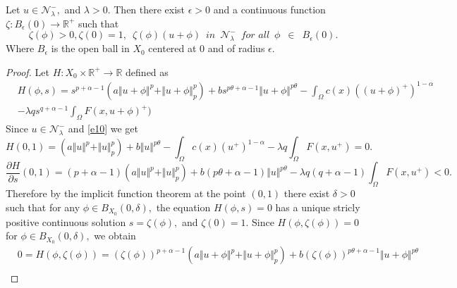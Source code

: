 \documentclass[10pt,twoside,reqno,centertags,draft]{amsart}
\begin{document}
\begin{lemma}\label{l4}
Let $ u \in \mathcal{N}_{\lambda}^{-},$ and $ \lambda > 0.$ Then there exist $ \epsilon > 0$ and a continuous function 
$ \zeta : B_{\epsilon}(0) \longrightarrow \mathbb{R}^{+}$ such that
\begin{equation*}
\zeta(\phi) > 0, \zeta(0) = 1, \,\,\, \zeta(\phi)(u +\phi)\,\,\, in\,\,\, \mathcal{N}_{\lambda}^{-} \,\,\, \textit{for all} \,\,\, \phi \,\,\, \in \,\,\, B_{\epsilon}(0).
\end{equation*}
Where  $ B_{\epsilon}$ is the open ball in $ X_0$ centered at $ 0$ and of radius $ \epsilon.$
\end{lemma}
\begin{proof}
Let $ H : X_0 \times \mathbb{R}^{+} \longrightarrow \mathbb{R}$ defined as
{\footnotesize
\begin{equation*}
\begin{aligned}
& H(\phi, s) =s^{p +\alpha -1} \left( a\Vert u +\phi\Vert^{p} +\Vert u +\phi\Vert^{p}_{p}\right) +b s^{p\theta +\alpha -1}\Vert u +\phi\Vert^{p\theta} -\int_{\Omega}c(x)((u +\phi)^+)^{1 -\alpha}\\
&- \lambda q s^{q +\alpha -1} \int_{\Omega} F(x,u +\phi)^+)
\end{aligned}
\end{equation*}
} 
Since $ u \in \mathcal{N}_{\lambda}^{-}$ and \ref{e10} we get
\begin{equation}\label{e13}
H(0, 1) = \left( a\Vert u\Vert^{p} +\Vert u\Vert^{p}_{p}\right) +b \Vert u\Vert^{p\theta}-\int_{\Omega}c(x)(u^+)^{1 -\alpha} - \lambda q\int_{\Omega} F(x,u^+) =0.
\end{equation}
{\footnotesize
\begin{equation} \label{e14}
\frac{\partial H}{\partial s}(0, 1) =(p +\alpha -1)\left( a\Vert u\Vert^{p} +\Vert u\Vert^{p}_{p}\right) +b (p\theta +\alpha -1)\Vert u\Vert^{p\theta} -\lambda q
(q +\alpha -1)\int_{\Omega} F(x,u^+) < 0.
\end{equation}
}
Therefore by the implicit function theorem at the point $ (0, 1)$ there exist $ \delta >0$ such that for any $ \phi \in B_{X_0}(0, \delta),$ the equation
$ H(\phi, s) =0$ has a unique stricly positive continuous solution $ s = \zeta(\phi),$ and $ \zeta(0) =1.$ Since $ H(\phi, \zeta(\phi)) =0$ for 
$ \phi \in B_{X_0}(0, \delta),$ we obtain
\begin{equation*}
\begin{aligned}
&0 =H(\phi, \zeta(\phi)) =(\zeta(\phi))^{p +\alpha -1} \left( a\Vert u +\phi\Vert^{p} +\Vert u +\phi\Vert^{p}_{p}\right) +b (\zeta(\phi))^{p\theta +\alpha -1}\Vert u +\phi\Vert^{p\theta} \\

\end{aligned}
\end{equation*}
\end{proof}
\end{document}
